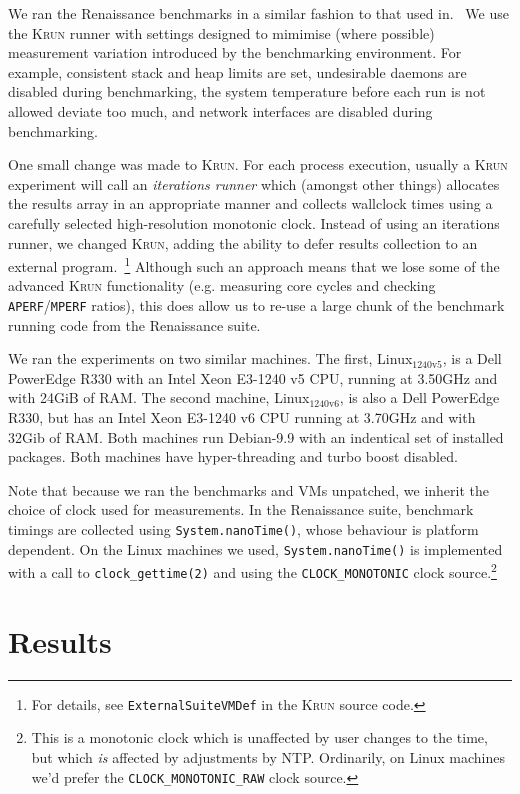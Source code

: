 \documentclass[a4paper]{article}
\newcommand{\krun}{\textsc{Krun}\xspace}
\newcommand{\bencherseven}{Linux$_\mathrm{1240v5}$\xspace}
\newcommand{\bencherten}{Linux$_\mathrm{1240v6}$\xspace}
\begin{document}
We ran the Renaissance benchmarks in a similar fashion to that used
in.~\cite{barrett16warmup} We use the \krun runner with
settings designed to mimimise (where possible) measurement variation introduced
by the benchmarking environment. For example, consistent stack and heap limits
are set, undesirable daemons are disabled during benchmarking, the system
temperature before each run is not allowed deviate too much, and network
interfaces are disabled during benchmarking.

One small change was made to \krun. For each process execution, usually a
\krun experiment will call an \emph{iterations runner} which (amongst other
things) allocates the results array in an appropriate manner and collects
wallclock times using a carefully selected high-resolution monotonic clock. Instead
of using an iterations runner, we changed \krun, adding the ability to defer
results collection to an external program.~\footnote{For details, see
\texttt{ExternalSuiteVMDef} in the \krun source code.} Although such an approach
means that we lose some of the advanced \krun functionality (e.g.
measuring core cycles and checking \texttt{APERF}/\texttt{MPERF} ratios), this
does allow us to re-use a large chunk of the benchmark running code from the
Renaissance suite.

We ran the experiments on two similar machines. The first, \bencherseven, is a
Dell PowerEdge R330 with an Intel Xeon E3-1240 v5 CPU, running at 3.50GHz and
with 24GiB of RAM. The second machine, \bencherten, is also a Dell PowerEdge
R330, but has an Intel Xeon E3-1240 v6 CPU running at 3.70GHz
and with 32Gib of RAM. Both machines run Debian-9.9 with an indentical set of
installed packages. Both machines have hyper-threading and turbo boost
disabled.

Note that because we ran the benchmarks and VMs unpatched, we inherit the
choice of clock used for measurements. In the Renaissance suite, benchmark
timings are collected using \texttt{System.nanoTime()}, whose behaviour is
platform dependent. On the Linux machines we used, \texttt{System.nanoTime()}
is implemented with a call to \texttt{clock\_gettime(2)} and using the
\texttt{CLOCK\_MONOTONIC} clock source.\footnote{This is a monotonic clock which
is unaffected by user changes to the time, but which \emph{is} affected by
adjustments by NTP. Ordinarily, on Linux machines we'd prefer the
\texttt{CLOCK\_MONOTONIC\_RAW} clock source.}



\section{Results}
\label{sec:results}
\end{document}
